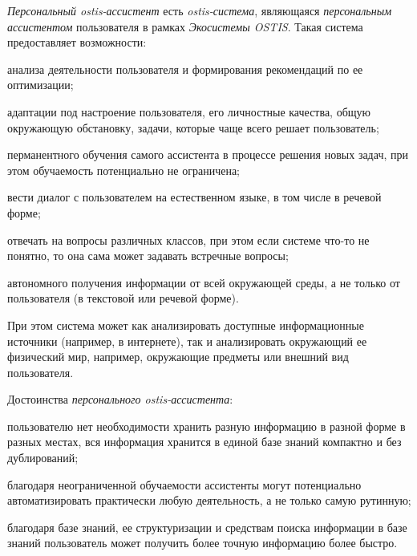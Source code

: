 \textit{Персональный ostis-ассистент} есть \textit{ostis-система}, являющаяся \textit{персональным ассистентом} пользователя в рамках \textit{Экосистемы OSTIS}.
Такая система предоставляет возможности:
\begin{textitemize}
    \item анализа деятельности пользователя и формирования рекомендаций по ее оптимизации;
    \item адаптации под настроение пользователя, его личностные качества, общую окружающую обстановку, задачи, которые чаще всего решает пользователь;
    \item перманентного обучения самого ассистента в процессе решения новых задач, при этом обучаемость потенциально не ограничена;
    \item вести диалог с пользователем на естественном языке, в том числе в речевой форме;
    \item отвечать на вопросы различных классов, при этом если системе что-то не понятно, то она сама может задавать встречные вопросы;
    \item автономного получения информации от всей окружающей среды, а не только от пользователя (в текстовой или речевой форме).
\end{textitemize}

При этом система может как анализировать доступные информационные источники (например, в интернете), так и анализировать окружающий ее физический мир, например, окружающие предметы или внешний вид пользователя.

Достоинства \textit{персонального ostis-ассистента}:
\begin{textitemize}
    \item пользователю нет необходимости хранить разную информацию в разной форме в разных местах, вся информация хранится в единой базе знаний компактно и без дублирований;
    \item благодаря неограниченной обучаемости ассистенты могут потенциально автоматизировать практически любую деятельность, а не только самую рутинную;
    \item благодаря базе знаний, ее структуризации и средствам поиска информации в базе знаний пользователь может получить более точную информацию более быстро.
\end{textitemize}

